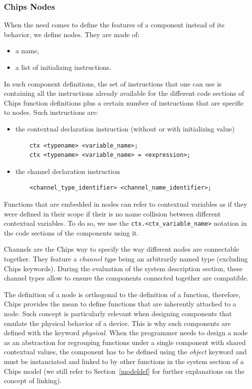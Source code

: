 \documentclass{article}
\begin{document}
\subsubsection{Chips Nodes}
\label{nodes}
When the need comes to define the features of a component instead of its behavior, we define nodes.
They are made of:
\begin{itemize}
    \item a name,
    \item a list of initializing instructions.
\end{itemize}

In such component definitions, the set of instructions that one can use is containing all the instructions already available for the different code sections of Chips function definitions plus a certain number of instructions that are specific to nodes. Such instructions are:
\begin{itemize}
    \item the contextual declaration instruction (without or with initializing value)
\begin{verbatim}
    ctx <typename> <variable_name>;
    ctx <typename> <variable_name> = <expression>;\end{verbatim}
    \item the channel declaration instruction
\begin{verbatim}
    <channel_type_identifier> <channel_name_identifier>;\end{verbatim}
\end{itemize}

Functions that are embedded in nodes can refer to contextual variables as if they were defined in their scope if their is no name collision between different contextual variables. To do so, we use the \verb'ctx.<ctx_variable_name>' notation in the code sections of the components using it.

Channels are the Chips way to specify the way different nodes are connectable together. They feature a \emph{channel type} being an arbitrarily named type (excluding Chips keywords). During the evaluation of the system description section, these channel types allow to ensure the components connected together are compatible.

The definition of a node is orthogonal to the definition of a function, therefore, Chips provides the mean to define functions that are inherently attached to a node. Such concept is particularly relevant when designing components that emulate the physical behavior of a device. This is why such components are defined with the keyword \emph{physical}. When the programmer needs to design a node as an abstraction for regrouping functions under a single component with shared contextual values, the component has to be defined using the \emph{object} keyword and must be instanciated and linked to by other functions in the system section of a Chips model (we still refer to Section~\ref{modeldef} for further explanations on the concept of linking).
\end{document}
